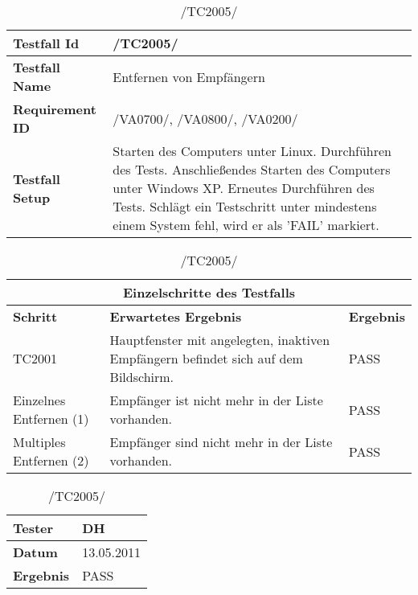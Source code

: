 \begin{table}[h]
\caption{/TC2005/}
\label{tab:TC2005}
\begin{center}
\begin{tabular}{|p{3.5cm}|p{11cm}|}
\hline
\textbf{Testfall Id} & /TC2005/\\
\hline
\textbf{Testfall Name} & Entfernen von Empfängern\\
\hline
\textbf{Requirement ID} & /VA0700/, /VA0800/, /VA0200/\\
\hline
\textbf{Testfall Setup} & Starten des Computers unter Linux. Durchführen des Tests.
Anschließendes Starten des Computers unter Windows XP. Erneutes Durchführen des Tests. Schlägt ein Testschritt unter mindestens einem System fehl, wird er als 'FAIL' markiert.\\
\hline
\end{tabular}
\begin{tabular}{|p{4cm}|p{7.8cm}|p{2.3cm}|}
\multicolumn{3}{|c|}{\textbf{Einzelschritte des Testfalls}} \\
\hline
\textbf{Schritt} & \textbf{Erwartetes Ergebnis} & \textbf{Ergebnis}\\
\hline
TC2001 & Hauptfenster mit angelegten,
inaktiven Empfängern befindet sich auf dem Bildschirm. & PASS\\
\hline
Einzelnes Entfernen (1) & Empfänger ist nicht mehr
in der Liste vorhanden. & PASS\\
\hline
Multiples Entfernen (2) & Empfänger sind nicht mehr
in der Liste vorhanden. & PASS\\
\hline
\end{tabular}
\begin{tabular}{|p{3.5cm}|p{11cm}|}
\textbf{Tester} & DH\\
\hline
\textbf{Datum} & 13.05.2011\\
\hline
\textbf{Ergebnis} & PASS\\
\hline
\end{tabular}
\end{center}
\end{table}

